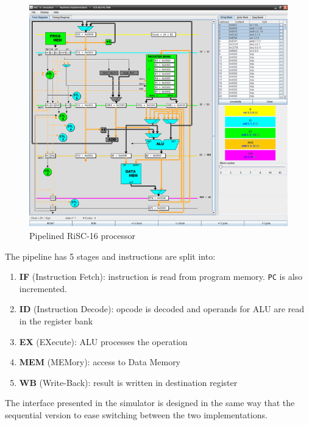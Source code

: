 \documentclass[10pt,a4paper]{article}
\theoremstyle{definition}%
\begin{document}
\begin{figure}[h!]
	\begin{center}
		\includegraphics[width=15cm]{figures/100000000000028000000226ACEB2984.jpg}
	\end{center}
\caption{Pipelined RiSC-16 processor}
\label{fig:risc}
\end{figure}

The pipeline has 5 stages and instructions are split into:
\begin{enumerate}
\item \textbf{IF} (Instruction Fetch): instruction is read from program memory. \verb!PC! is also incremented.
\item \textbf{ID} (Instruction Decode): opcode is decoded and operands for ALU are read in the register bank
\item \textbf{EX} (EXecute): ALU processes the operation
\item \textbf{MEM} (MEMory): access to Data Memory
\item \textbf{WB} (Write-Back): result is written in destination register
\end{enumerate}


The interface presented in the simulator is designed in the same way that the sequential version to ease switching between the two implementations.
\end{document}

